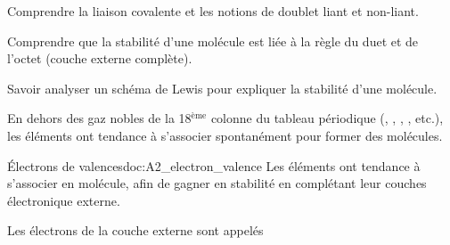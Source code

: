 \teteSndMole



\begin{objectifs}
  \item Comprendre la liaison covalente et les notions de doublet liant et non-liant.
  \item Comprendre que la stabilité d'une molécule est liée à la règle du duet et de l'octet (couche externe complète).
  \item Savoir analyser un schéma de Lewis pour expliquer la stabilité d'une molécule.
\end{objectifs}

\begin{contexte}
  En dehors des gaz nobles de la 18$^\text{ème}$ colonne du tableau périodique (, , , , etc.), les éléments ont tendance à s'associer spontanément pour former des molécules. 
  
\end{contexte}



\begin{doc}{Électrons de valences}{doc:A2_electron_valence}
  Les éléments ont tendance à s'associer en molécule, afin de gagner en stabilité en complétant leur couches électronique externe.  \begin{importants}  
    Les électrons de la couche externe sont appelés 
  \end{importants}  
\end{doc}
  
